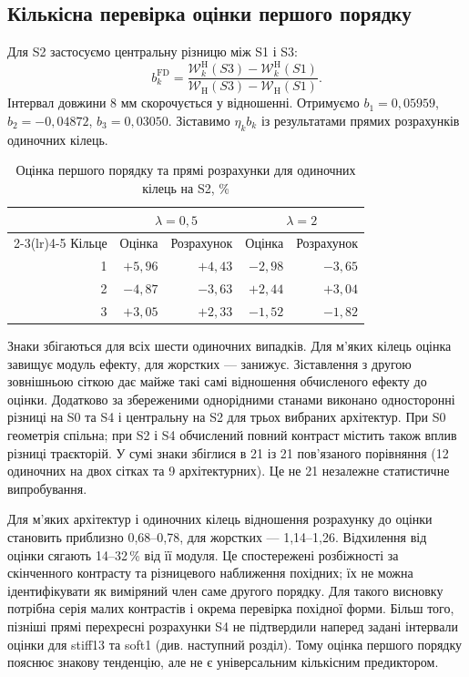 \subsection{Кількісна перевірка оцінки першого порядку}

Для S2 застосуємо центральну різницю між S1 і S3:
\begin{equation}
 b_k^{\mathrm{FD}}=
 \frac{\mathcal W_k^{\mathrm H}(S3)-\mathcal W_k^{\mathrm H}(S1)}
 {\mathcal W_{\mathrm H}(S3)-\mathcal W_{\mathrm H}(S1)}.
 \label{eq:ring-b-fd}
\end{equation}
Інтервал довжини 8 мм скорочується у відношенні. Отримуємо $b_1=0{,}05959$, $b_2=-0{,}04872$, $b_3=0{,}03050$. Зіставимо $\eta_k b_k$ із результатами прямих розрахунків одиночних кілець.

\begin{table}[htbp]
 \centering
 \caption{Оцінка першого порядку та прямі розрахунки для одиночних кілець на S2, \%}
 \label{tab:ring-first}
 \begin{tabular}{rrrrr}
 \toprule
 & \multicolumn{2}{c}{$\lambda=0{,}5$} & \multicolumn{2}{c}{$\lambda=2$}\\
 \cmidrule(lr){2-3}\cmidrule(lr){4-5}
 Кільце & Оцінка & Розрахунок & Оцінка & Розрахунок\\
 \midrule
 1 & $+5,96$ & $+4,43$ & $-2,98$ & $-3,65$\\
 2 & $-4,87$ & $-3,63$ & $+2,44$ & $+3,04$\\
 3 & $+3,05$ & $+2,33$ & $-1,52$ & $-1,82$\\
 \bottomrule
 \end{tabular}
\end{table}

Знаки збігаються для всіх шести одиночних випадків. Для м'яких кілець оцінка завищує модуль ефекту, для жорстких --- занижує. Зіставлення з другою зовнішньою сіткою дає майже такі самі відношення обчисленого ефекту до оцінки. Додатково за збереженими однорідними станами виконано односторонні різниці на S0 та S4 і центральну на S2 для трьох вибраних архітектур. При S0 геометрія спільна; при S2 і S4 обчислений повний контраст містить також вплив різниці траєкторій. У сумі знаки збіглися в 21 із 21 пов'язаного порівняння (12 одиночних на двох сітках та 9 архітектурних). Це не 21 незалежне статистичне випробування.

Для м'яких архітектур і одиночних кілець відношення розрахунку до оцінки становить приблизно 0,68--0,78, для жорстких --- 1,14--1,26. Відхилення від оцінки сягають 14--32\,\% від її модуля. Це спостережені розбіжності за скінченного контрасту та різницевого наближення похідних; їх не можна ідентифікувати як виміряний член саме другого порядку. Для такого висновку потрібна серія малих контрастів і окрема перевірка похідної форми. Більш того, пізніші прямі перехресні розрахунки S4 не підтвердили наперед задані інтервали оцінки для stiff13 та soft1 (див. наступний розділ). Тому оцінка першого порядку пояснює знакову тенденцію, але не є універсальним кількісним предиктором.

